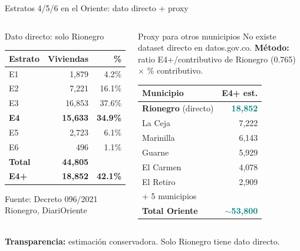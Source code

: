 \documentclass[aspectratio=169, 11pt]{beamer}
\newcommand{\highlight}[1]{\textcolor{teal}{\textbf{#1}}}
\begin{document}
{
\begin{frame}{Estratos 4/5/6 en el Oriente: dato directo + proxy}
\begin{columns}[T]
\begin{alertblock}{\small Dato directo: solo Rionegro}
\tiny
\begin{tabular}{@{}lrr@{}}
\toprule
\textbf{Estrato} & \textbf{Viviendas} & \textbf{\%} \\
\midrule
E1 & 1,879 & 4.2\% \\
E2 & 7,221 & 16.1\% \\
E3 & 16,853 & 37.6\% \\
\rowcolor{teal!10}
\textbf{E4} & \textbf{15,633} & \textbf{34.9\%} \\
\rowcolor{teal!8}
E5 & 2,723 & 6.1\% \\
\rowcolor{teal!6}
E6 & 496 & 1.1\% \\
\midrule
\textbf{Total} & \textbf{44,805} & \\
\rowcolor{teal!12}
\textbf{E4+} & \textbf{18,852} & \textbf{42.1\%} \\
\bottomrule
\end{tabular}

\vspace{1pt}
{\tiny Fuente: Decreto 096/2021 Rionegro, DiariOriente}
\end{alertblock}

\begin{block}{\small Proxy para otros municipios}
\scriptsize
No existe dataset directo en datos.gov.co. \textbf{Método:} ratio E4+/contributivo de Rionegro (0.765) $\times$ \% contributivo.

\vspace{2pt}
\tiny
\begin{tabular}{@{}lr@{}}
\toprule
\textbf{Municipio} & \textbf{E4+ est.} \\
\midrule
\textbf{Rionegro} (directo) & \highlight{18,852} \\
La Ceja & 7,222 \\
Marinilla & 6,143 \\
Guarne & 5,929 \\
El Carmen & 4,078 \\
El Retiro & 2,909 \\
{\tiny + 5 municipios} & \\
\midrule
\textbf{Total Oriente} & \highlight{$\sim$53,800} \\
\bottomrule
\end{tabular}
\end{block}
\end{columns}
\vspace{1pt}
{\tiny\textcolor{amber!80!black}{\textbf{Transparencia:}} estimación conservadora. Solo Rionegro tiene dato directo.}
\end{frame}
}
\end{document}

